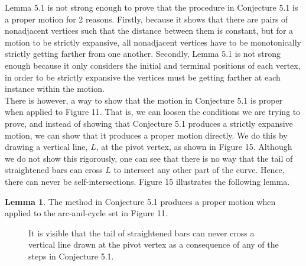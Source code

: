 \documentclass{article}
\theoremstyle{definition}
\newtheorem{lemma}{Lemma}[section]
\begin{document}
\noindent Lemma 5.1 is not strong enough to prove that the procedure in Conjecture 5.1 is a proper motion for 2 reasons. Firstly, because it shows that there are pairs of nonadjacent vertices such that the distance between them is constant, but for a motion to be strictly expansive, all nonadjacent vertices have to be monotonically strictly getting farther from one another. Secondly, Lemma 5.1 is not strong enough because it only considers the initial and terminal positions of each vertex, in order to be strictly expansive the vertices must be getting farther at each instance within the motion.\vspace{0.5em}\\
There is however, a way to show that the motion in Conjecture 5.1 is proper when applied to Figure 11. That is, we can loosen the conditions we are trying to prove, and instead of showing that Conjecture 5.1 produces a strictly expansive motion, we can show that it produces a proper motion directly. We do this by drawing a vertical line, $L$, at the pivot vertex, as shown in Figure 15. Although we do not show this rigorously, one can see that there is no way that the tail of straightened bars can cross $L$ to intersect any other part of the curve. Hence, there can never be self-intersections. Figure 15 illustrates the following lemma.
\begin{lemma}
    The method in Conjecture 5.1 produces a proper motion when applied to the arc-and-cycle set in Figure 11.
\end{lemma}
\begin{figure}[h]
    \centering
    \begin{minipage}{0.49\textwidth}
        \centering
    \end{minipage}
    \hfill
    \begin{minipage}{0.49\textwidth}
        \centering
    \end{minipage}
    \caption{It is visible that the tail of straightened bars can never cross a vertical line drawn at the pivot vertex as a consequence of any of the steps in Conjecture 5.1.}
\end{figure}
\end{document}
